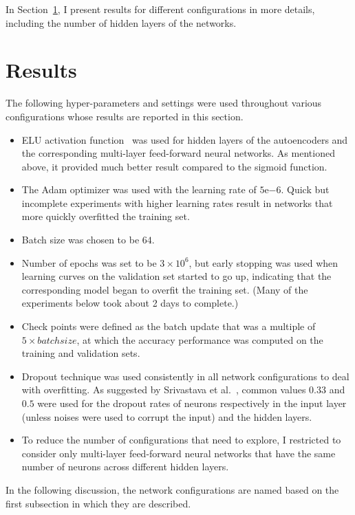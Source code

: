 \documentclass[12pt]{article}
\begin{document}
In Section~\ref{sec:results}, I present results for different configurations in more details, including the number of hidden layers of the networks.

\section{Results}
\label{sec:results}

\noindent
The following hyper-parameters and settings were used throughout various configurations whose results are reported in this section.
\begin{itemize}
\item ELU activation function~\cite{clevert2015fast} was used for hidden layers of the autoencoders and the corresponding multi-layer feed-forward neural networks. As mentioned above, it provided much better result compared to the sigmoid function.
\item The Adam optimizer was used with the learning rate of $5\mathrm{e}{-6}$. Quick but incomplete experiments with higher learning rates result in networks that more quickly overfitted the training set.
\item Batch size was chosen to be $64$.
\item Number of epochs was set to be $3\times10^6$, but early stopping was used when learning curves on the validation set started to go up, indicating that the corresponding model began to overfit the training set. (Many of the experiments below took about 2 days to complete.)
\item Check points were defined as the batch update that was a multiple of $5 \times batchsize$, at which the accuracy performance was computed on the training and validation sets.
\item Dropout technique was used consistently in all network configurations to deal with overfitting. As suggested by Srivastava et al.~\cite{srivastava2014dropout}, common values $0.33$ and $0.5$ were used for the dropout rates of neurons respectively in the input layer (unless noises were used to corrupt the input) and the hidden layers.
\item To reduce the number of configurations that need to explore, I restricted to consider only multi-layer feed-forward neural networks that have the same number of neurons across different hidden layers.
\end{itemize}

In the following discussion, the network configurations are named based on the first subsection in which they are described.
\end{document}
